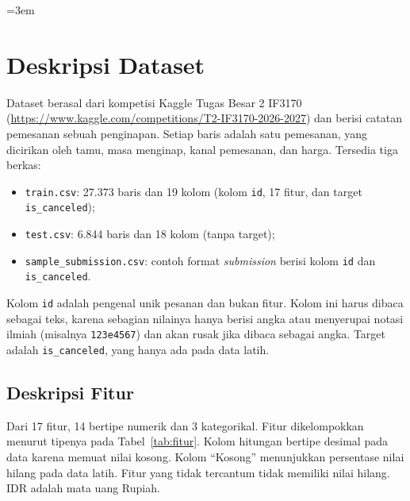 \begingroup\emergencystretch=3em
\section{Deskripsi Dataset}
\label{sec:dataset}

Dataset berasal dari kompetisi Kaggle Tugas Besar 2 IF3170 (\url{https://www.kaggle.com/competitions/T2-IF3170-2026-2027}) dan berisi catatan pemesanan sebuah penginapan. Setiap baris adalah satu pemesanan, yang dicirikan oleh tamu, masa menginap, kanal pemesanan, dan harga. Tersedia tiga berkas:
\begin{itemize}
	\item \texttt{train.csv}: 27.373 baris dan 19 kolom (kolom \texttt{id}, 17 fitur, dan target \texttt{is\_canceled});
	\item \texttt{test.csv}: 6.844 baris dan 18 kolom (tanpa target);
	\item \texttt{sample\_\allowbreak submission.csv}: contoh format \textit{submission} berisi kolom \texttt{id} dan \texttt{is\_canceled}.
\end{itemize}
Kolom \texttt{id} adalah pengenal unik pesanan dan bukan fitur. Kolom ini harus dibaca sebagai teks, karena sebagian nilainya hanya berisi angka atau menyerupai notasi ilmiah (misalnya \texttt{123e4567}) dan akan rusak jika dibaca sebagai angka. Target adalah \texttt{is\_canceled}, yang hanya ada pada data latih.

\subsection{Deskripsi Fitur}
\label{subsec:deskripsi-fitur}

Dari 17 fitur, 14 bertipe numerik dan 3 kategorikal. Fitur dikelompokkan menurut tipenya pada Tabel~\ref{tab:fitur}. Kolom hitungan bertipe desimal pada data karena memuat nilai kosong. Kolom ``Kosong'' menunjukkan persentase nilai hilang pada data latih. Fitur yang tidak tercantum tidak memiliki nilai hilang. IDR adalah mata uang Rupiah.

